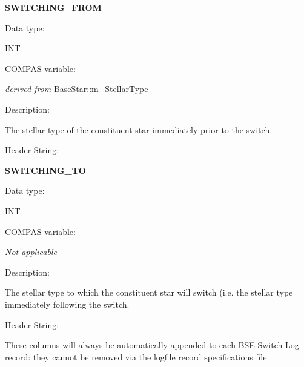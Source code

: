 \medskip
\begin{minipage}{\textwidth} %
    \textbf{SWITCHING\_FROM} \\
    \parskip 0pt
    \begin{minipage}[t][][b]{8.25em}Data type:\end{minipage}
    \begin{minipage}[t][][b]{\dimexpr\textwidth-8.75em}INT\end{minipage}\vfill
    \begin{minipage}[t][][b]{8.25em}COMPAS variable:\end{minipage}
    \begin{minipage}[t][][b]{\dimexpr\textwidth-8.75em}\textit{derived from }BaseStar::m\_StellarType\end{minipage}\vfill
    \begin{minipage}[t][][b]{8.25em}Description:\end{minipage}
    \begin{minipage}[t][][b]{\dimexpr\textwidth-8.75em}\raggedright{The stellar type of the constituent star immediately prior to the switch.}\end{minipage}\vfill
    \begin{minipage}[t][][b]{8.25em}Header String:\end{minipage}
    \begin{minipage}[t][][b]{\dimexpr\textwidth-8.75em}\raggedright{}\end{minipage}\vfill
\end{minipage}

\medskip
\begin{minipage}{\textwidth} %
    \textbf{SWITCHING\_TO} \\
    \parskip 0pt
    \begin{minipage}[t][][b]{8.25em}Data type:\end{minipage}
    \begin{minipage}[t][][b]{\dimexpr\textwidth-8.75em}INT\end{minipage}\vfill
    \begin{minipage}[t][][b]{8.25em}COMPAS variable:\end{minipage}
    \begin{minipage}[t][][b]{\dimexpr\textwidth-8.75em}\textit{Not applicable}\end{minipage}\vfill
    \begin{minipage}[t][][b]{8.25em}Description:\end{minipage}
    \begin{minipage}[t][][b]{\dimexpr\textwidth-8.75em}\raggedright{The stellar type to which the constituent star will switch (i.e. the stellar type immediately following the switch.}\end{minipage}\vfill
    \begin{minipage}[t][][b]{8.25em}Header String:\end{minipage}
    \begin{minipage}[t][][b]{\dimexpr\textwidth-8.75em}\raggedright{}\end{minipage}\vfill
\end{minipage}

\bigskip
These columns will always be automatically appended to each BSE Switch Log record: they cannot be removed via the logfile record specifications file.
